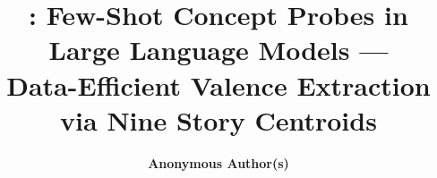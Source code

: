\documentclass{article}
\title{\ours: Few-Shot Concept Probes in Large Language Models --- \\ Data-Efficient Valence Extraction via Nine Story Centroids}
\author{%
\textbf{Anonymous Author(s)}
}
\begin{document}
\maketitle









\newpage
{\small


}

\newpage

\end{document}
